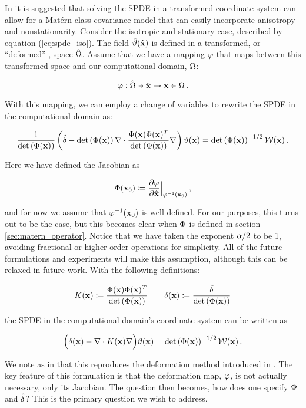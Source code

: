 In \citet{RSSB:RSSB777} it is suggested that solving the SPDE in a transformed
coordinate system can allow for a Mat\'ern class covariance
model that can easily incorporate anisotropy and nonstationarity.
Consider the isotropic and stationary case, described by equation
(\ref{eq:spde_iso}).
The field $\hat{\vartheta}(\hat{\mathbf{x}})$ is defined in a transformed, or ``deformed''
\citep{sampson_nonparametric_1992}, space $\hat{\Omega}$.
Assume that we have a mapping $\varphi$ that maps between this transformed space
and our computational domain, $\Omega$:
\begin{linenomath*}\begin{equation*}
    \varphi : \hat{\Omega}\ni\hat{\mathbf{x}} \rightarrow \mathbf{x}\in\Omega \, .
\end{equation*}\end{linenomath*}
With this mapping, we can employ a change of variables
\citep{smith_change_1934} to rewrite the SPDE in the computational domain as:
\begin{linenomath*}\begin{equation*}
    \dfrac{1}{\text{det}\left(\Phi(\mathbf{x})\right)}
    \left(\hat{\delta} -
    \text{det}\left(\Phi(\mathbf{x})\right)\nabla\cdot
    \dfrac{\Phi(\mathbf{x})\Phi(\mathbf{x})^T}{\text{det}\left(\Phi(\mathbf{x})\right)}
    \nabla\right)\vartheta(\mathbf{x}) =
    \text{det}\left(\Phi(\mathbf{x})\right)^{-1/2}\mathcal{W}(\mathbf{x}) \, .
\end{equation*}\end{linenomath*}
Here we have defined the Jacobian as
\begin{linenomath*}\begin{equation*}
    \Phi(\mathbf{x}_0) \coloneqq
    \dfrac{\partial \varphi}{\partial \hat{\mathbf{x}}}\Big|_{\varphi^{-1}(\mathbf{x}_{0})} \, ,
\end{equation*}\end{linenomath*}
and for now we assume that $\varphi^{-1}(\mathbf{x}_0)$ is well defined.
For our purposes, this turns out to be the case, but this becomes clear when
$\Phi$ is defined in section \ref{sec:matern_operator}.
Notice that we have taken the exponent $\alpha/2$ to be 1, avoiding
fractional or higher order operations for simplicity.
All of the future formulations and experiments will make this assumption,
although this can be relaxed in future work.
With the following definitions:
\begin{linenomath}\begin{equation}
    K(\mathbf{x}) \coloneqq
    \dfrac{\Phi(\mathbf{x})\Phi(\mathbf{x})^T}{\text{det}\left(\Phi(\mathbf{x})\right)}
    \qquad
    \delta(\mathbf{x}) \coloneqq \dfrac{\hat{\delta}}{\text{det}\left(\Phi(\mathbf{x})\right)}
    \label{eq:matern_definitions}
\end{equation}\end{linenomath}
the SPDE in the computational domain's coordinate system can be written as
\begin{linenomath}\begin{equation}
    \Big(\delta(\mathbf{x})- \nabla\cdot K(\mathbf{x})\nabla\Big)\vartheta(\mathbf{x}) =
    \text{det}\left(\Phi(\mathbf{x})\right)^{-1/2}\mathcal{W}(\mathbf{x}) \, .
    \label{eq:spde_general}
\end{equation}\end{linenomath}
We note as in \citet{RSSB:RSSB777} that this reproduces the deformation method
introduced in \citet{sampson_nonparametric_1992}.
The key feature of this formulation is that the deformation map, $\varphi$, is
not actually necessary, only its Jacobian.
The question then becomes, how does one specify $\Phi$ and $\hat{\delta}$?
This is the primary question we wish to address.
